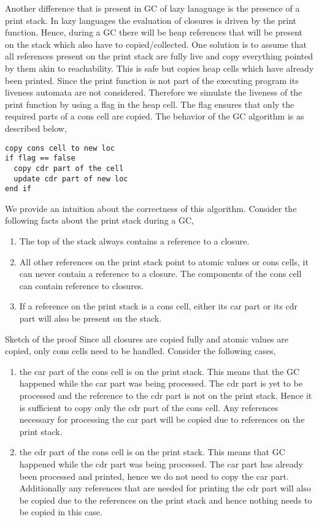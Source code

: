 \documentclass{sig-alternate}
\begin{document}
Another difference that is present in GC of lazy lanaguage is the presence of a print stack. In lazy 
languages the evaluation of closures is driven by the print function. Hence, during a GC there will be 
heap references that will be present on the stack which also have to copied/collected. One solution is to 
assume that all references present on the print stack are fully live and copy everything pointed by them 
akin to reachability. This is safe but copies heap cells which have already been printed. Since the print 
function is not part of the executing program its liveness automata are not considered. Therefore we 
simulate the liveness of the print function by using a flag in the heap cell. The flag ensures that only the 
required parts of a cons cell are copied. The behavior of the GC algorithm is as described below,
\begin{verbatim}
copy cons cell to new loc
if flag == false
  copy cdr part of the cell
  update cdr part of new loc
end if
\end{verbatim}
We provide an intuition about the correctness of this algorithm. Consider the following facts about the print stack 
during a GC,
\begin{enumerate}
\item The top of the stack always contains a reference to a closure.
\item All other references on the print stack point to atomic values or cons cells, it can never contain a
reference to a closure. The components of the cons cell can contain reference to closures.
\item If a reference on the print stack is a cons cell, either its car part or its cdr part will also be 
present on the stack.
\end{enumerate}
Sketch of the proof
Since all closures are copied fully and atomic values are copied, only cons cells need to be handled. 
Consider the following cases,
\begin{enumerate}
\item the car part of the cons cell is on the print stack. This means that the GC happened while 
the car part was being processed. The cdr part is yet to be processed and the reference to the cdr part 
is not on the print stack. Hence it is sufficient to copy only the cdr part of the cons cell. Any references 
necessary for processing the car part will be copied due to references on the print stack.
\item the cdr part of the cons cell is on the print stack. This means that GC happened while 
the cdr part was being processed.  The car part has already been processed and printed, hence we do not 
need to copy the car part. Additionally any references that are needed for printing the cdr part will 
also be copied due to the references on the print stack and hence nothing needs to be copied in this case.
\end{enumerate}
\end{document}

